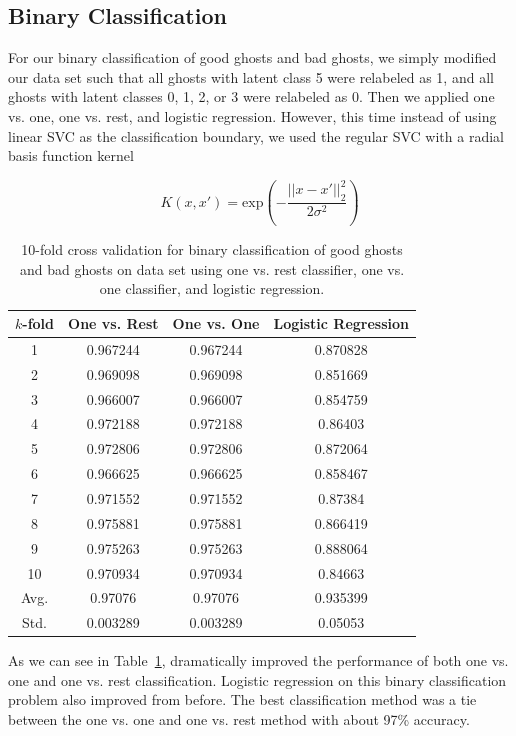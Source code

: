 \documentclass[11pt]{amsart}
\begin{document}
\subsection{Binary Classification}

For our binary classification of good ghosts and bad ghosts, we simply modified our data set such that all ghosts with latent class 5 were relabeled as 1, and all ghosts with latent classes 0, 1, 2, or 3 were relabeled as 0. Then we applied one vs. one, one vs. rest, and logistic regression. However, this time instead of using linear SVC as the classification boundary, we used the regular SVC with a radial basis function kernel

$$ K(x,x') = \text{exp}\left(-\frac{|| x - x' ||_2^2}{2\sigma^2}\right) $$

\begin{table}[b]
\caption{10-fold cross validation for binary classification of good ghosts and bad ghosts on data set using one vs. rest classifier, one vs. one classifier, and logistic regression.}
\centering
\begin{tabular}{c  c  c  c}
\hline \hline [0.5ex]
$k$-fold & One vs. Rest & One vs. One & Logistic Regression \\ [0.5ex]
\hline
1 & 0.967244 & 0.967244 & 0.870828 \\
2 & 0.969098 & 0.969098 & 0.851669 \\
3 & 0.966007 & 0.966007 & 0.854759 \\
4 & 0.972188 & 0.972188 & 0.86403 \\
5 & 0.972806 & 0.972806 & 0.872064 \\
6 & 0.966625 & 0.966625 & 0.858467 \\
7 & 0.971552 & 0.971552 & 0.87384 \\
8 & 0.975881 & 0.975881 & 0.866419 \\
9 & 0.975263 & 0.975263 & 0.888064 \\
10 & 0.970934 & 0.970934 & 0.84663 \\
\hline
Avg. & 0.97076 & 0.97076 & 0.935399 \\
Std. & 0.003289 & 0.003289 & 0.05053 \\
\hline
\end{tabular}
\label{table:binary}
\end{table}

As we can see in Table~\ref{table:binary}, dramatically improved the performance of both one vs. one and one vs. rest classification. Logistic regression on this binary classification problem also improved from before. The best classification method was a tie between the one vs. one and one vs. rest method with about 97\% accuracy.
\end{document}
